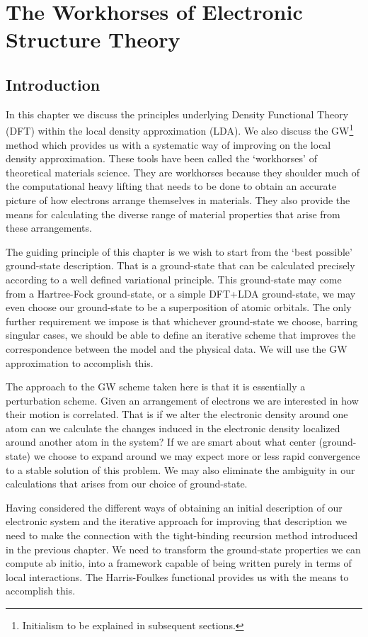 \chapter{The Workhorses of Electronic Structure Theory}
\label{chap:gw}
\noindent
\section{Introduction}
In this chapter we discuss the principles underlying Density Functional
Theory (DFT) within the local density approximation (LDA).
We also discuss the GW\footnote{Initialism to be explained in subsequent sections.} method
which provides us with a systematic way of improving on the local density approximation.
These tools have been called the `workhorses' of theoretical materials science\cite{sohrab17}.
They are workhorses because they shoulder much of the computational heavy lifting that needs
to be done to obtain an accurate picture of how electrons arrange themselves in materials.
They also provide the means for calculating the diverse range of material properties 
that arise from these arrangements.

The guiding principle of this chapter is we wish to start 
from the `best possible' ground-state description.
That is a ground-state that can be calculated precisely according to a 
well defined variational principle. 
This ground-state may come from a Hartree-Fock ground-state, or a simple
DFT+LDA ground-state, we may even choose our
ground-state to be a superposition of atomic orbitals. The only further requirement
we impose is that whichever ground-state we choose, barring singular cases,
we should be able to define an iterative scheme that improves the correspondence
between the model and the physical data. We will use the GW approximation to accomplish this.

The approach to the GW scheme taken here is that it is essentially a perturbation scheme.
Given an arrangement of electrons we are interested in how their motion is correlated.
That is if we alter the electronic density around one atom can we calculate the changes induced in 
the electronic density localized around another atom in the system?
If we are smart about what center (ground-state) we choose to expand around we may
expect more or less rapid convergence to a stable solution of this problem. We may also eliminate
the ambiguity in our calculations that arises from our choice of ground-state.

Having considered the different ways of obtaining an initial description of our
electronic system and the iterative approach for improving that description we need
to make the connection with the tight-binding recursion method introduced in the previous chapter. 
We need to transform the ground-state properties we can compute ab initio, 
into a framework capable of being written purely in terms of local interactions.
The Harris-Foulkes functional provides us with the means to accomplish this. 

